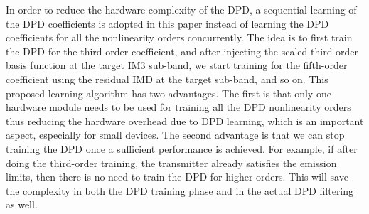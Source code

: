 In order to reduce the hardware complexity of the DPD, a sequential learning of the DPD coefficients is adopted in this paper instead of learning the DPD coefficients for all the nonlinearity orders concurrently. 
The idea is to first train the DPD for the third-order coefficient, and after injecting the scaled third-order basis function at the target IM3 sub-band, we start training for the fifth-order coefficient using the residual IMD at the target sub-band, and so on. 
This proposed learning algorithm has two advantages. 
The first is that only one hardware module needs to be used for training all the DPD nonlinearity orders thus reducing the hardware overhead due to DPD learning, which is an important aspect, especially for small devices. 
The second advantage is that we can stop training the DPD once a sufficient performance is achieved. 
For example, if after doing the third-order training, the transmitter already satisfies the emission limits, then there is no need to train the DPD for higher orders. 
This will save the complexity in both the DPD training phase and in the actual DPD filtering as well.

